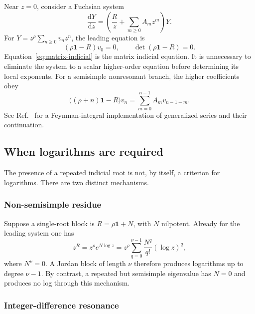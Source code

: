 \documentclass[11pt]{article}
\newcommand{\dd}{\mathrm d}
\newcommand{\Id}{\mathbf 1}
\begin{document}
Near $z=0$, consider a Fuchsian system
\begin{equation}
  \frac{\dd Y}{\dd z}
  =\left(\frac{R}{z}+\sum_{m\geq0}A_m z^m\right)Y.
  \label{eq:fuchsian-system}
\end{equation}
For $Y=z^\rho\sum_{n\geq0}v_nz^n$, the leading equation is
\begin{equation}
  (\rho\Id-R)v_0=0,
  \qquad
  \det(\rho\Id-R)=0.
  \label{eq:matrix-indicial}
\end{equation}
Equation~\eqref{eq:matrix-indicial} is the matrix indicial equation.  It is unnecessary to
eliminate the system to a scalar higher-order equation before determining its local
exponents.  For a semisimple nonresonant branch, the higher coefficients obey
\begin{equation}
  \bigl((\rho+n)\Id-R\bigr)v_n
  =\sum_{m=0}^{n-1}A_m v_{n-1-m}.
  \label{eq:frobenius-recurrence}
\end{equation}
See Ref.~\cite{Moriello:2019yhu} for a Feynman-integral implementation of generalized
series and their continuation.

\subsection{When logarithms are required}
\label{subsec:log}

The presence of a repeated indicial root is not, by itself, a criterion for logarithms.
There are two distinct mechanisms.

\subsubsection{Non-semisimple residue}

Suppose a single-root block is $R=\rho\Id+N$, with $N$ nilpotent.  Already for the leading
system one has
\begin{equation}
  z^R=z^\rho e^{N\log z}
  =z^\rho\sum_{q=0}^{\nu-1}\frac{N^q}{q!}(\log z)^q,
  \label{eq:jordan-log}
\end{equation}
where $N^\nu=0$.  A Jordan block of length $\nu$ therefore produces logarithms up to degree
$\nu-1$.  By contrast, a repeated but semisimple eigenvalue has $N=0$ and produces no log
through this mechanism.

\subsubsection{Integer-difference resonance}
\end{document}
